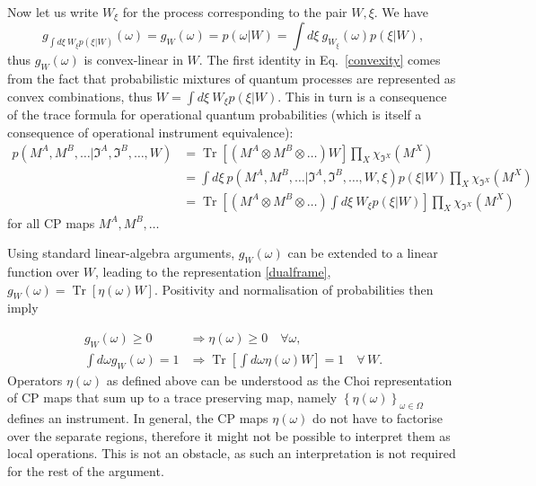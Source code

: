 \documentclass[a4paper,onecolumn,11pt,accepted=2018-05-04]{quantumarticle}
\DeclareMathOperator{\tr}{Tr}
\begin{document}
Now let us write $W_{\xi}$ for the process corresponding to the pair $W, \xi$. We have
\begin{equation}
\label{convexity}
g_{\int d{\xi}~W_{\xi}p({\xi}|W)}(\omega)= g_W(\omega) =  p(\omega|W) %
= \int d{\xi}~ g_{W_{\xi}} (\omega) p({\xi}|W), 
\end{equation}
thus $g_W(\omega)$ is convex-linear in $W$. The first identity in Eq.~\eqref{convexity} comes from the fact that probabilistic mixtures of quantum processes are represented as convex combinations, thus $W = \int d{\xi}~W_{\xi} p({\xi}|W)$. This in turn is a consequence of the trace formula for operational quantum probabilities (which is itself a consequence of operational instrument equivalence):
\begin{align}
p(M^A, M^B,\dots|\mathfrak{I}^A, \mathfrak{I}^B,\dots, W) 
&= \tr \left[(M^A \otimes M^B \otimes\dots) W \right] \prod_{X}  \chi_{\mathfrak{I}^X}(M^X)\\ \nonumber
&= \int d{\xi }~p(M^A, M^B,\dots|\mathfrak{I}^A, \mathfrak{I}^B,\dots, W,\xi) p({\xi}|W) \prod_{X}  \chi_{\mathfrak{I}^X}(M^X) \\
&=  \tr\left[ (M^A \otimes M^B \otimes\dots)\int d{\xi }~W_{\xi } p({\xi}|W) \right] \prod_{X}  \chi_{\mathfrak{I}^X}(M^X)
\end{align}
for all CP maps $M^A, M^B,\dots$

Using standard linear-algebra arguments, $g_W(\omega)$ can be extended to a linear function over $W$, leading to the representation \eqref{dualframe}, $g_W(\omega)= \tr\left[ \eta(\omega)W\right]$. Positivity and normalisation of probabilities then imply

\begin{align}
g_W(\omega) \geq 0 &\Rightarrow \eta(\omega) \geq 0 \quad \forall \omega, \\ \label{etanormalisation}
\int d\omega  g_W(\omega) = 1 &\Rightarrow \tr\left[ \int d\omega \eta(\omega) W \right]= 1 \quad \forall\, W. 
\end{align}
Operators $\eta(\omega)$ as defined above can be understood as the Choi representation of CP maps that sum up to a trace preserving map, namely $\left\{\eta(\omega)\right\}_{\omega\in \Omega}$ defines an instrument. In general, the CP maps $\eta(\omega)$ do not have to factorise over the separate regions, therefore it might not be possible to interpret them as local operations. This is not an obstacle, as such an interpretation is not required for the rest of the argument.
\end{document}
